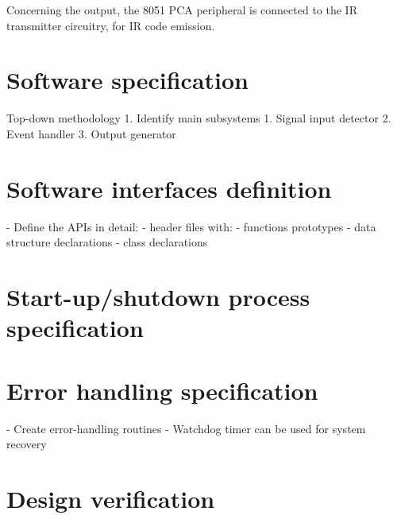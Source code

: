 Concerning the output, the 8051 PCA peripheral is connected to the IR
transmitter circuitry, for IR code emission.
%
  \vspace{-5mm}
%  
\section{Software specification}
\label{sec:sw-specs}
Top-down methodology
1. Identify main subsystems
   1. Signal input detector
   2. Event handler
   3. Output generator
%
  \vspace{-5mm}
%  
\section{Software interfaces definition}
\label{sec:sw-interf-def}
- Define the APIs in detail:
  - header files with:
    - functions prototypes
    - data structure declarations
    - class declarations

\section{Start-up/shutdown process specification}
\label{sec:startup-shutdown}
%
  \vspace{-5mm}
%  
\section{Error handling specification}
\label{sec:error-handling-specification}
- Create error-handling routines
- Watchdog timer can be used for system recovery
%
  \vspace{-5mm}
%  
\section{Design verification}
\label{sec:design-verification}
%
  \vspace{-5mm}
%  
